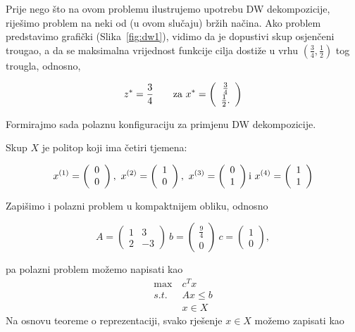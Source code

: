 \documentclass[a4paper, utf8, 11pt, colorlinks]{book}
\theoremstyle{definition}
\begin{document}
 Prije nego što na ovom problemu ilustrujemo upotrebu DW dekompozicije, riješimo problem na neki od (u ovom slučaju) bržih načina. Ako problem predstavimo grafički (Slika~\ref{fig:dw1}), vidimo da je dopustivi skup osjenčeni trougao, a da se maksimalna vrijednost funkcije cilja dostiže u vrhu $(\frac34, 
 \frac12)$ tog trougla, odnosno,

    \begin{equation}
 z^* = \frac 34\qquad \textnormal{za}\ x^*=\left(\begin{array}{c}
 	\frac34\\
 	\frac12.
 \end{array}\right)
 \end{equation}
 
 Formirajmo sada polaznu konfiguraciju za primjenu DW dekompozicije.
 
 Skup $X$ je politop koji ima četiri tjemena:
 
 $$   
 x^{(1)}=\left(\begin{array}{c}
 		0\\
 		0
 	\end{array}\right),\  x^{(2)}=\left(\begin{array}{c}
 	1\\
 	0
 \end{array}\right),\  x^{(3)}=\left(\begin{array}{c}
 0\\
 1
\end{array}\right) \textnormal{i}\ x^{(4)}=\left(\begin{array}{c}
1\\
1
\end{array}\right)
$$
 
 Zapišimo i polazni problem u kompaktnijem obliku, odnosno
 
 $$
 A = \left(\begin{array}{cc}
 	1 & 3 \\
 	2 & -3
 \end{array}\right) \ b=\left(\begin{array}{c}
 \frac 9 4\\
 0
\end{array}\right)\ c=\left(\begin{array}{c}
1\\
0
\end{array}\right),
 $$
 
 pa polazni problem možemo napisati kao
    \begin{equation}
 	\begin{aligned}\label{primjer:dw2}
 		\max\  &c^Tx\\
 		s.t.\  &Ax\leqslant b\\
 		&x \in X
 	\end{aligned}
 \end{equation}
Na osnovu teoreme o reprezentaciji, svako rješenje $x \in X$ možemo zapisati kao
\end{document}
